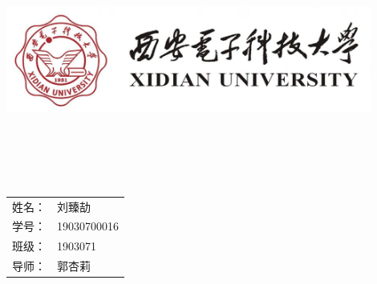 \begin{titlepage}
	\newcommand{\ID}{{\Large 000000000}}
	\newcommand{\supervisor}{{\Large 李田所}}
	\newcommand{\class}{{\Large 班级}}
    
	\center
	\quad\\[1cm]
	\includegraphics[width=12cm]{Content/西安电子科技大学-logo.jpg}\\[2cm]
	
	\quad\\[1cm]
	\makeatletter
	
	{\linespread{4}\Huge\bfseries\@title}\\[1cm]
	\begin{table}[H]
		\centering
		\subtitle{\textsf {基于图论与矩阵分解的协同过滤推荐方法对比}}\\[2.5cm]
		  \begin{tabular}{rl}
			{\Large 姓名：}&{\Large 刘臻劼}\\[0.5cm]
			{\Large 学号：}&{\Large 19030700016}\\[0.5cm]
			{\Large 班级：}&{\Large 1903071}\\[0.5cm]
			{\Large 导师：}&{\Large 郭杏莉}
		  \end{tabular}\\
	\end{table}
	\makeatother
	\quad\\[1cm]
	\vfill 
\end{titlepage}